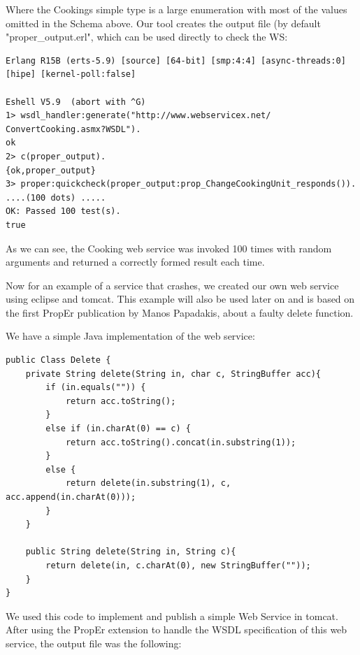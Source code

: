 \documentclass[submission,copyright,a4]{eptcs}
\begin{document}
Where the Cookings simple type is a large enumeration with most of the values omitted in the Schema above. Our tool creates the output file (by default "proper\_output.erl", which can be used directly to check the WS:

\begin{lstlisting}
Erlang R15B (erts-5.9) [source] [64-bit] [smp:4:4] [async-threads:0] [hipe] [kernel-poll:false]

Eshell V5.9  (abort with ^G)
1> wsdl_handler:generate("http://www.webservicex.net/
ConvertCooking.asmx?WSDL").
ok
2> c(proper_output).
{ok,proper_output}
3> proper:quickcheck(proper_output:prop_ChangeCookingUnit_responds()).
....(100 dots) .....
OK: Passed 100 test(s).
true
\end{lstlisting}

As we can see, the Cooking web service was invoked 100 times with random arguments and returned a correctly formed result each time.

Now for an example of a service that crashes, we created our own web service using eclipse and tomcat. This example will also be used later on and is based on the first PropEr publication by Manos Papadakis, about a faulty delete function.

We have a simple Java implementation of the web service:

\begin{lstlisting}
public Class Delete {
    private String delete(String in, char c, StringBuffer acc){
        if (in.equals("")) {
            return acc.toString();
        }
        else if (in.charAt(0) == c) {
            return acc.toString().concat(in.substring(1));
        }
        else {
            return delete(in.substring(1), c, acc.append(in.charAt(0)));
        }
    }
    
    public String delete(String in, String c){
        return delete(in, c.charAt(0), new StringBuffer(""));
    } 
}
\end{lstlisting}

We used this code to implement and publish a simple Web Service in tomcat. After using the PropEr extension to handle the WSDL specification of this web service, the output file was the following:
\end{document}
